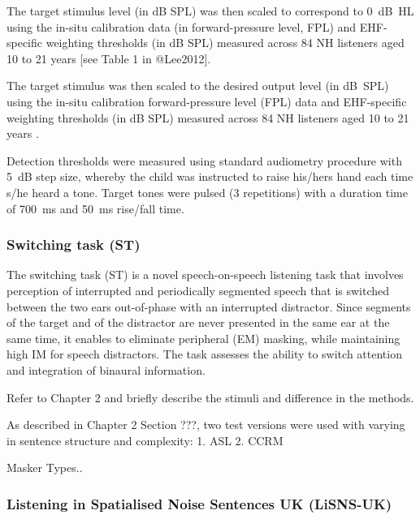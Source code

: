 \documentclass[a4paper, twoside]{templates/ociamthesis}
\begin{document}
\begin{correction}
The target stimulus level (in dB SPL) was then scaled to correspond to
0~dB~HL using the in-situ calibration data (in forward-pressure level,
FPL) and EHF-specific weighting thresholds (in dB SPL) measured across
84 NH listeners aged 10 to 21 years {[}see Table 1 in @Lee2012{]}.
\end{correction}

The target stimulus was then scaled to the desired output level (in dB~SPL) using the in-situ calibration forward-pressure level (FPL) data and EHF-specific weighting thresholds (in dB SPL) measured across 84 NH listeners aged 10 to 21 years \autocite[see Table 1 in][]{Lee2012}.

Detection thresholds were measured using standard audiometry procedure with 5~dB step size, whereby the child was instructed to raise his/hers hand each time s/he heard a tone. Target tones were pulsed (3 repetitions) with a duration time of 700~ms and 50~ms rise/fall time.

\hypertarget{switching-task-st}{%
\subsubsection{Switching task (ST)}\label{switching-task-st}}

The switching task (ST) is a novel speech-on-speech listening task that involves perception of interrupted and periodically segmented speech that is switched between the two ears out-of-phase with an interrupted distractor. Since segments of the target and of the distractor are never presented in the same ear at the same time, it enables to eliminate peripheral (EM) masking, while maintaining high IM for speech distractors. The task assesses the ability to switch attention and integration of binaural information.

Refer to Chapter 2 and briefly describe the stimuli and difference in the methods.

As described in Chapter 2 Section ???, two test versions were used with varying in sentence structure and complexity: 1. ASL 2. CCRM

Masker Types..

\hypertarget{listening-in-spatialised-noise-sentences-uk-lisns-uk}{%
\subsubsection{Listening in Spatialised Noise Sentences UK (LiSNS-UK)}\label{listening-in-spatialised-noise-sentences-uk-lisns-uk}}
\end{document}
